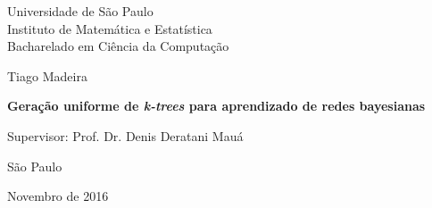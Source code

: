 \begin{center}
  \vspace*{1cm}
  Universidade de São Paulo\\
  Instituto de Matemática e Estatística\\
  Bacharelado em Ciência da Computação

  \vspace*{3cm}
  {\Large Tiago Madeira}

  \vspace{3cm}
  {
    \Large \bfseries
    Geração uniforme de \emph{k-trees} para aprendizado de redes bayesianas
  }

  \vspace{3cm}
  Supervisor: Prof. Dr. Denis Deratani Mauá

  \vspace{2cm}
  São Paulo

  Novembro de 2016
\end{center}
